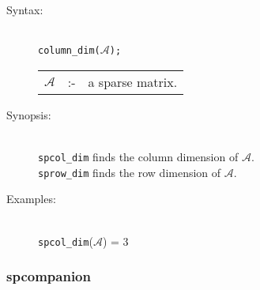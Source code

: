\begin{description}
\item[Syntax:]\mbox{}\\
\texttt{column\_dim($\mathcal{A}$);}\\[2mm]
\begin{tabular}{l l l}
$\mathcal{A}$ &:-& a sparse matrix.
\end{tabular}

\item[Synopsis:]\mbox{}\\
\texttt{spcol\_dim} finds the column dimension of 
                $\mathcal{A}$. \\
\texttt{sprow\_dim} finds the row dimension of $\mathcal{A}$.

\item[Examples:]\mbox{}\\
\texttt{spcol\_dim}($\mathcal{A}$) = 3
\end{description}

\subsubsection{spcompanion}
\label{sparse:spcompanion}

